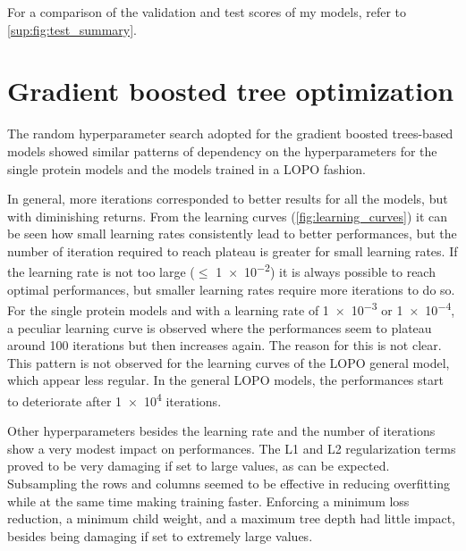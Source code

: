 For a comparison of the validation and test scores of my models, refer to \autoref{sup:fig:test_summary}.

\begin{figure}[t]
\end{figure}

\section{Gradient boosted tree optimization}
The random hyperparameter search adopted for the gradient boosted trees-based models showed similar patterns of dependency on the hyperparameters for the single protein models and the models trained in a LOPO fashion.

In general, more iterations corresponded to better results for all the models, but with diminishing returns.
From the learning curves (\autoref{fig:learning_curves}) it can be seen how small learning rates consistently lead to better performances, but the number of iteration required to reach plateau is greater for small learning rates.
If the learning rate is not too large ($\leq$ \num{1e-2}) it is always possible to reach optimal performances, but smaller learning rates require more iterations to do so.
For the single protein models and with a learning rate of \num{1e-3} or \num{1e-4}, a peculiar learning curve is observed where the performances seem to plateau around \num{100} iterations but then increases again.
The reason for this is not clear.
This pattern is not observed for the learning curves of the LOPO general model, which appear less regular.
In the general LOPO models, the performances start to deteriorate after \num{1e4} iterations.

Other hyperparameters besides the learning rate and the number of iterations show a very modest impact on performances.
The L1 and L2 regularization terms proved to be very damaging if set to large values, as can be expected.
Subsampling the rows and columns seemed to be effective in reducing overfitting while at the same time making training faster.
Enforcing a minimum loss reduction, a minimum child weight, and a maximum tree depth had little impact, besides being damaging if set to extremely large values.

